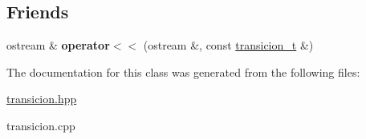 \subsection*{Friends}
\begin{DoxyCompactItemize}
\item 
\hypertarget{classtransicion__t_a84ca203b70d3ea4bccfbc90d945a37f3}{}\label{classtransicion__t_a84ca203b70d3ea4bccfbc90d945a37f3} 
ostream \& {\bfseries operator$<$$<$} (ostream \&, const \hyperlink{classtransicion__t}{transicion\+\_\+t} \&)
\end{DoxyCompactItemize}


The documentation for this class was generated from the following files\+:\begin{DoxyCompactItemize}
\item 
\hyperlink{transicion_8hpp}{transicion.\+hpp}\item 
transicion.\+cpp\end{DoxyCompactItemize}
